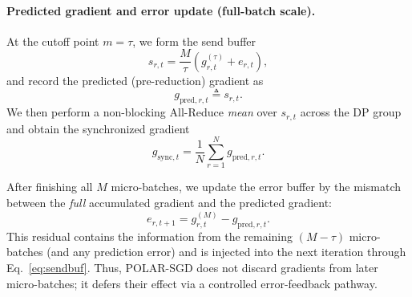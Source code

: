 \paragraph{Predicted gradient and error update (full-batch scale).}
At the cutoff point $m=\tau$, we form the send buffer
\begin{equation}
s_{r,t} = \frac{M}{\tau}\left(g_{r,t}^{(\tau)} + e_{r,t}\right),
\label{eq:sendbuf}
\end{equation}
and record the predicted (pre-reduction) gradient as
\begin{equation}
g_{\mathrm{pred},r,t} \triangleq s_{r,t}.
\end{equation}
We then perform a non-blocking All-Reduce \emph{mean} over $s_{r,t}$ across the DP group and obtain the synchronized gradient
\begin{equation}
g_{\mathrm{sync},t} = \frac{1}{N}\sum_{r=1}^{N} g_{\mathrm{pred},r,t}.
\end{equation}

After finishing all $M$ micro-batches, we update the error buffer by the mismatch between the \emph{full} accumulated gradient and the predicted gradient:
\begin{equation}
e_{r,t+1} = g_{r,t}^{(M)} - g_{\mathrm{pred},r,t}.
\label{eq:error_update}
\end{equation}
This residual contains the information from the remaining $(M-\tau)$ micro-batches (and any prediction error) and is injected into the next iteration through Eq.~\eqref{eq:sendbuf}. Thus, POLAR-SGD does not discard gradients from later micro-batches; it defers their effect via a controlled error-feedback pathway.


